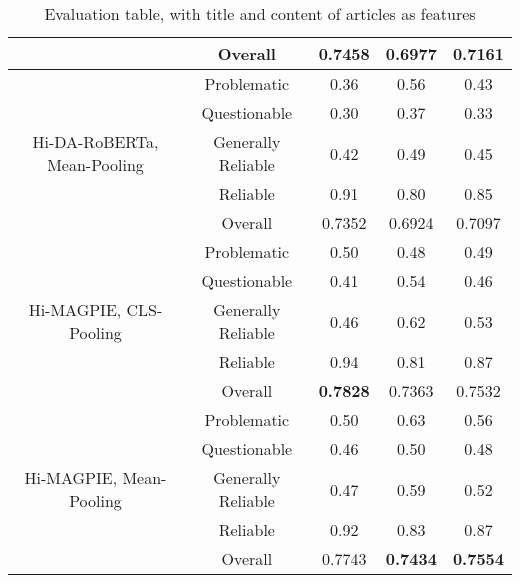 \begin{table}[htbp]
\begin{longtable}{| c | c | c | c | c |}
                                                          & Overall            & 0.7458             & 0.6977          & 0.7161          \\
        \hline
        \multirow{5}{*}{Hi-DA-RoBERTa, Mean-Pooling}      & Problematic        & 0.36               & 0.56            & 0.43            \\
                                                          & Questionable       & 0.30               & 0.37            & 0.33            \\
                                                          & Generally Reliable & 0.42               & 0.49            & 0.45            \\
                                                          & Reliable           & 0.91               & 0.80            & 0.85            \\\cline{2-5}
                                                          & Overall            & 0.7352             & 0.6924          & 0.7097          \\
        \hline
        \multirow{5}{*}{Hi-MAGPIE, CLS-Pooling}           & Problematic        & 0.50               & 0.48            & 0.49            \\
                                                          & Questionable       & 0.41               & 0.54            & 0.46            \\
                                                          & Generally Reliable & 0.46               & 0.62            & 0.53            \\
                                                          & Reliable           & 0.94               & 0.81            & 0.87            \\\cline{2-5}
                                                          & Overall            & \textbf{0.7828}    & 0.7363          & 0.7532          \\
        \hline
        \multirow{5}{*}{Hi-MAGPIE, Mean-Pooling}          & Problematic        & 0.50               & 0.63            & 0.56            \\
                                                          & Questionable       & 0.46               & 0.50            & 0.48            \\
                                                          & Generally Reliable & 0.47               & 0.59            & 0.52            \\
                                                          & Reliable           & 0.92               & 0.83            & 0.87            \\\cline{2-5}
                                                          & Overall            & 0.7743             & \textbf{0.7434} & \textbf{0.7554} \\
        \hline
    \end{longtable}
    \caption{Evaluation table, with title and content of articles as features}
    \label{table:eval}
\end{table}

